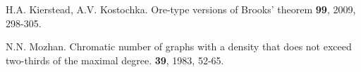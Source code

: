 \documentclass[11pt]{amsart}
\theoremstyle{plain}
\theoremstyle{definition}
\theoremstyle{remark}
\begin{document}
\begin{thebibliography}{1}
H.A. Kierstead, A.V. Kostochka.
\newblock Ore-type versions of Brooks' theorem
 \textbf{99}, 2009, \mbox{298-305}.

N.N. Mozhan.
\newblock Chromatic number of graphs with a density that does not exceed two-thirds of the maximal degree.
 \textbf{39}, 1983, \mbox{52-65}.
\end{thebibliography}
\end{document}
